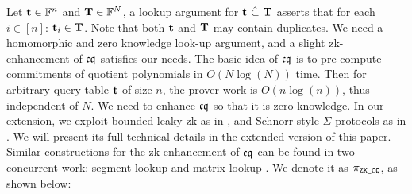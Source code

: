% 
% 
% 

Let ${{\mathbf {t}}} \in \mathbb{F}^n$ and
${{\mathbf {T}}} \in \mathbb{F}^N$, a lookup argument for ${{\mathbf {t}}} ~\hat{\subset}~ {{\mathbf {T}}}$
asserts that for each $i\in [n]$: ${{\mathbf {t}}}_i \in {{\mathbf {T}}}$.
Note that both ${{\mathbf {t}}}$ and ${{\mathbf {T}}}$ may contain duplicates.
We need a homomorphic and zero knowledge look-up argument, and
a slight zk-enhancement of ${\mathfrak{cq}}$ \cite{cq} satisfies our needs.
The basic idea of ${\mathfrak{cq}}$ is to pre-compute commitments of
quotient polynomials in $O(N\log(N))$ time. Then 
for arbitrary query table ${{\mathbf {t}}}$
of size $n$, the prover work is $O(n\log(n))$, thus 
independent of $N$. We need to enhance ${\mathfrak{cq}}$ so that it is zero knowledge.
In our extension, we exploit bounded leaky-zk as in \cite{Marlin,CCG23},
and Schnorr style $\Sigma$-protocols as in \cite{binacc22}. 
We will present its full technical details in the extended version 
of this paper.  Similar constructions for the zk-enhancement
of ${\mathfrak{cq}}$ can be found in two concurrent work:
segment lookup \cite{CCG23} and matrix lookup \cite{MatrixLookup}.
We denote it as $\pi_\texttt{ZK\_CQ}$, as shown below:

